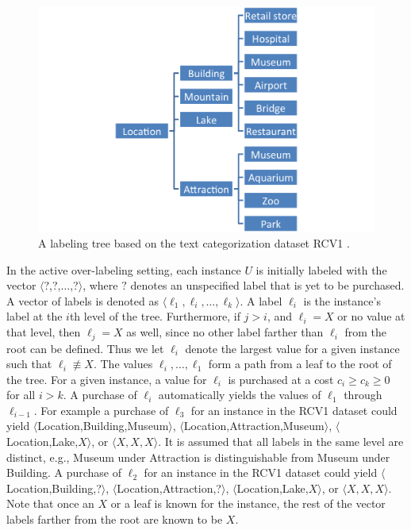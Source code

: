 \documentclass[ms]{nuthesis}
\begin{document}
\FloatBarrier
\begin{figure}[!htb]
	\centering
    \includegraphics[width=0.75\columnwidth]{fig/exp-ontology}
    \caption{A labeling tree based on the text categorization dataset RCV1 \cite{Lewis2004}.}
    \label{fig:exp-ontology}
\end{figure}
\FloatBarrier

In the active over-labeling setting, each instance $U$ is initially labeled with the vector
$\langle$?,?,$\ldots$,?$\rangle$, where $?$ denotes an unspecified label that is yet to be
purchased. A vector of labels is denoted as $\langle \ell_1,\ell_i,\ldots,\ell_k \rangle$.
A label $\ell_i$ is the instance's label at the $i$th
level of the tree. Furthermore, if $j > i$, and $\ell_i = X$ or no value at that level,
then $\ell_j=X$ as well, since no other label farther than $\ell_i$
from the root can be defined. Thus we let $\ell_i$ denote the largest value for a given
 instance such that $\ell_i \not\equiv X$. The values $\ell_i,\ldots,\ell_1$ form a path
  from a leaf to the root of the tree. For a given instance, a value for $\ell_i$ is purchased
  at a cost $c_i \geq c_k \geq 0$ for all $i>k$. A purchase of $\ell_i$ automatically
  yields the values of $\ell_1$ through $\ell_{i-1}$. For example a purchase of $\ell_3$ for
  an instance in the RCV1 dataset could yield $\langle$Location,Building,Museum$\rangle$,  $\langle$Location,Attraction,Museum$\rangle$,
$\langle$Location,Lake,$X\rangle$, or $\langle X,X,X \rangle$. It is assumed
that all labels in the same level are distinct, e.g., Museum under Attraction
is distinguishable from Museum under Building. A purchase of $\ell_2$ for an instance
in the RCV1 dataset could yield $\langle$Location,Building,?$\rangle$,  $\langle$Location,Attraction,?$\rangle$,
$\langle$Location,Lake,$X\rangle$, or $\langle X,X,X \rangle$. Note that once an $X$ or
a leaf is known for the instance, the rest of the vector labels farther from the root are
known to be $X$.
\end{document}
